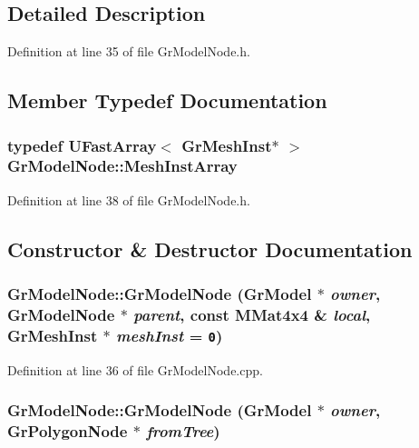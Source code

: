 \subsection{Detailed Description}


Definition at line 35 of file GrModelNode.h.

\subsection{Member Typedef Documentation}
\hypertarget{class_gr_model_node_7476f52e379fe6e8778e1f990343cee0}{
\subsubsection[{MeshInstArray}]{\setlength{\rightskip}{0pt plus 5cm}typedef {\bf UFastArray}$<$ {\bf GrMeshInst}$\ast$ $>$ {\bf GrModelNode::MeshInstArray}}}
\label{class_gr_model_node_7476f52e379fe6e8778e1f990343cee0}




Definition at line 38 of file GrModelNode.h.

\subsection{Constructor \& Destructor Documentation}
\hypertarget{class_gr_model_node_30cd7578448ddbb5b07276de2d96cfed}{
\subsubsection[{GrModelNode}]{\setlength{\rightskip}{0pt plus 5cm}GrModelNode::GrModelNode ({\bf GrModel} $\ast$ {\em owner}, \/  {\bf GrModelNode} $\ast$ {\em parent}, \/  const {\bf MMat4x4} \& {\em local}, \/  {\bf GrMeshInst} $\ast$ {\em meshInst} = {\tt 0})}}
\label{class_gr_model_node_30cd7578448ddbb5b07276de2d96cfed}




Definition at line 36 of file GrModelNode.cpp.\hypertarget{class_gr_model_node_b63d4ab8c48384da1c14bc5032fde28d}{
\subsubsection[{GrModelNode}]{\setlength{\rightskip}{0pt plus 5cm}GrModelNode::GrModelNode ({\bf GrModel} $\ast$ {\em owner}, \/  {\bf GrPolygonNode} $\ast$ {\em fromTree})}}
\label{class_gr_model_node_b63d4ab8c48384da1c14bc5032fde28d}




